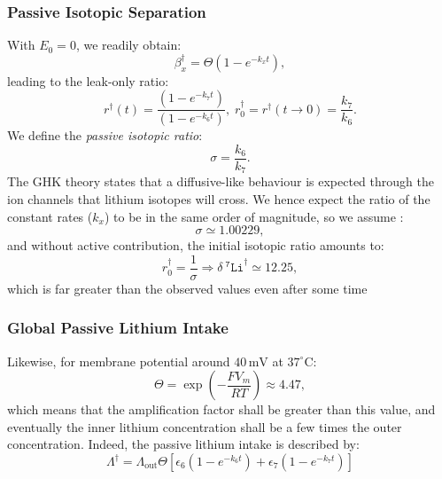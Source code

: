 \documentclass[aps,onecolumn,11pt]{revtex4}
\newcommand{\mychem}[1]{\mathtt{#1}}
\newcommand{\spLi}[1]{{~^{\mychem{#1}}\mychem{Li}}}
\newcommand{\deltaLi}{ {\delta\!\!\!\spLi{7}} }
\newcommand{\LiAll}{\Lambda}
\newcommand{\LiAllOut}{{\LiAll}_{\mathrm{out}}}
\newcommand{\todo}[1]{\framebox{\textbf{\color{WildStrawberry}{#1}}}}
\newcommand{\ko}{\dagger}
\begin{document}
\subsubsection{Passive Isotopic Separation}
With $E_0=0$, we readily obtain:
\begin{equation}
	\beta^\ko_x = \Theta \left(1-e^{-k_xt} \right),
\end{equation}
leading to the leak-only ratio:
\begin{equation}
	r^\ko(t) =  \dfrac{\left(1-e^{-k_7t} \right)}{\left(1-e^{-k_6t} \right)},\;r^\ko_0 = r^\ko(t\to0) = \dfrac{k_7}{k_6}.
\end{equation}
We define the \textit{passive isotopic ratio}:
\begin{equation}
\label{eq:sigma}
	\sigma  =  \dfrac{k_6}{k_7}.
\end{equation}
The GHK theory states that a diffusive-like behaviour is expected through the ion channels that lithium isotopes will cross.
We hence expect the ratio of the constant rates ($k_x$) to be in the same order of magnitude, so we assume \todo{ref}:
\begin{equation}
	\sigma \simeq 1.00229,
\end{equation}
and without active contribution, the initial isotopic ratio amounts to:
\begin{equation}
	r_0^\ko = \dfrac{1}{\sigma} \Rightarrow \deltaLi^\ko \simeq  12.25,
\end{equation}
which is far greater than the observed values even after some time \todo{ref figures in manuscript+values}


\subsubsection{Global Passive Lithium Intake}
Likewise, for membrane potential around $40\,\text{mV}$ at $37^\circ\text{C}$:
\begin{equation}
\label{eq:ThetaValue}
	\Theta = \exp\left( -\dfrac{FV_m}{RT}\right) \approx 4.47,
\end{equation}
which means that the amplification factor shall be greater than this value, and eventually the inner lithium concentration shall
be a few times the outer concentration. Indeed, the passive lithium intake is described by:
\begin{equation}
\label{eq:LiAllKO}
	\LiAll^\ko = \LiAllOut \Theta \left[ \epsilon_6 \left(1-e^{-k_6t}\right)  + \epsilon_7 \left(1-e^{-k_7t}\right)\right]
\end{equation}
\end{document}
